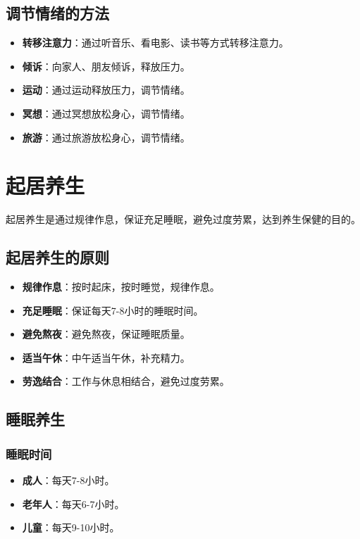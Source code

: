 \documentclass[12pt,UTF8]{ctexbook}
\begin{document}
\subsection{调节情绪的方法}

\begin{itemize}
\item \textbf{转移注意力}：通过听音乐、看电影、读书等方式转移注意力。
\item \textbf{倾诉}：向家人、朋友倾诉，释放压力。
\item \textbf{运动}：通过运动释放压力，调节情绪。
\item \textbf{冥想}：通过冥想放松身心，调节情绪。
\item \textbf{旅游}：通过旅游放松身心，调节情绪。
\end{itemize}

\section{起居养生}

起居养生是通过规律作息，保证充足睡眠，避免过度劳累，达到养生保健的目的。

\subsection{起居养生的原则}

\begin{itemize}
\item \textbf{规律作息}：按时起床，按时睡觉，规律作息。
\item \textbf{充足睡眠}：保证每天7-8小时的睡眠时间。
\item \textbf{避免熬夜}：避免熬夜，保证睡眠质量。
\item \textbf{适当午休}：中午适当午休，补充精力。
\item \textbf{劳逸结合}：工作与休息相结合，避免过度劳累。
\end{itemize}

\subsection{睡眠养生}

\subsubsection{睡眠时间}

\begin{itemize}
\item \textbf{成人}：每天7-8小时。
\item \textbf{老年人}：每天6-7小时。
\item \textbf{儿童}：每天9-10小时。
\end{itemize}
\end{document}
